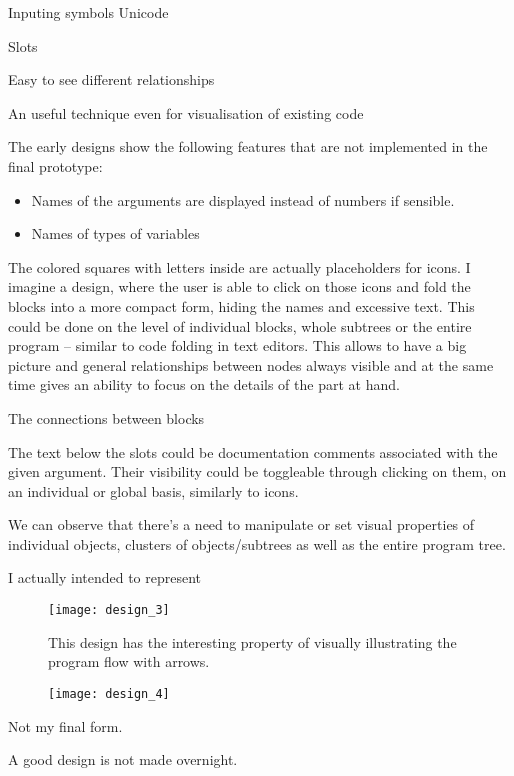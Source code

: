 Inputing symbols
Unicode

Slots

Easy to see different relationships

An useful technique even for visualisation of existing code

The early designs show the following features that are not implemented in the final prototype:
\begin{itemize}
	\item Names of the arguments are displayed instead of numbers if sensible.
	\item Names of types of variables
\end{itemize}

The colored squares with letters inside are actually placeholders for icons.
I imagine a design, where the user is able to click on those icons and fold the blocks into a more compact form, hiding the names and excessive text. This could be done on the level of individual blocks, whole subtrees or the entire program -- similar to code folding in text editors. This allows to have a big picture and general relationships between nodes always visible and at the same time gives an ability to focus on the details of the part at hand.

The connections between blocks 

The text below the slots could be documentation comments associated with the given argument. Their visibility could be toggleable through clicking on them, on an individual or global basis, similarly to icons.

We can observe that there's a need to manipulate or set visual properties of individual objects, clusters of objects/subtrees as well as the entire program tree. 

I actually intended to represent 


\begin{figure}[h!]
\centering
\texttt{[image: design\_3]}
\caption{This design has the interesting property of visually illustrating the program flow with arrows.}
\label{fig:design_3}
\end{figure}


\begin{figure}[h!]
\centering
\texttt{[image: design\_4]}
\caption{}
\label{fig:design_4}
\end{figure}

Not my final form.

A good design is not made overnight.

